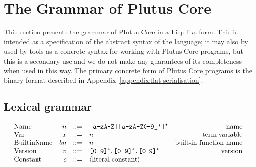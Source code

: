 \section{The Grammar of Plutus Core}
\label{sec:untyped-plc-grammar}
This section presents the grammar of Plutus Core in a Lisp-like form.  This is
intended as a specification of the abstract syntax of the language; it may also
by used by tools as a concrete syntax for working with Plutus Core programs, but
this is a secondary use and we do not make any guarantees of its completeness
when used in this way.  The primary concrete form of Plutus Core programs is the
binary format described in Appendix~\ref{appendix:flat-serialisation}.

\subsection{Lexical grammar}
\label{sec:untyped-plc}
\thispagestyle{plain}
\pagestyle{plain}

\begin{minipage}{\linewidth}
    \centering
    \[\begin{array}{lrclr}

        \textrm{Name}        & n      & ::= & \texttt{[a-zA-Z][a-zA-Z0-9\_\textquotesingle]\textsuperscript{*}}   & \textrm{name}\\

        \textrm{Var}           & x      & ::= & n & \textrm{term variable}\\
        \textrm{BuiltinName}   & bn     & ::= & n & \textrm{built-in function name}\\
        \textrm{Version} & v & ::= & \texttt{[0-9]\textsuperscript{+}.[0-9]\textsuperscript{+}.[0-9]\textsuperscript{+}}& \textrm{version}\\

        \textrm{Constant} & c & ::= & \langle{\textrm{literal constant}}\rangle& \\

    \end{array}\]
    \label{fig:lexical-grammar-untyped}
\end{minipage}%
%
%
%
%
%
%
%



